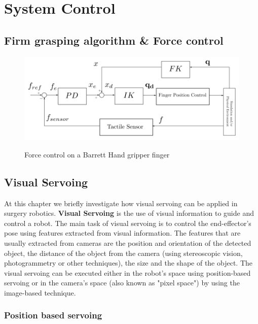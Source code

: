 \section{System Control}

\subsection{Firm grasping algorithm \& Force control}

\begin{center}
\begin{figure}[H]
\centering
\includegraphics[width=12cm]{images/finger-force-control.png}\\
\caption{Force control on a Barrett Hand gripper finger}
\end{figure}
\end{center}

\subsection{Visual Servoing}

At this chapter we briefly investigate how visual servoing can be applied in surgery robotics. \textbf{Visual Servoing} is the use of visual information 
to guide and control a robot. The main task of visual servoing is to control the end-effector's pose using features extracted from visual information. The 
features that are usually extracted from cameras are the position and orientation of the detected object, the distance of the object from the camera (using 
stereoscopic vision, photogrammetry or other techniques), the size and the shape of the object. The visual servoing can be executed either in the robot's space 
using position-based servoing or in the camera's space (also known as "pixel space") by using the image-based technique.

\subsubsection{Position based servoing}

